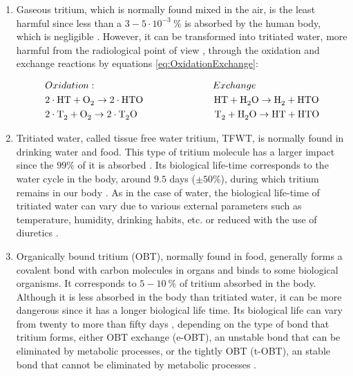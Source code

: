 \begin{enumerate}
\item{} Gaseous tritium, which is normally found mixed in the air, is the least harmful since less than a $3-5 \cdot{} 10^{-3}~\%$ is absorbed by the human body, which is negligible \cite{TritiumHandling}. However, it can be transformed into tritiated water, more harmful from the radiological point of view \cite{TritiumHandling}, through the oxidation and exchange reactions by equations \ref{eq:OxidationExchange}:

\begin{equation}
\begin{split}
& Oxidation: \qquad \qquad \qquad \qquad \qquad \qquad Exchange\\
& 2\cdot{}\ce{HT} + \ce{O_2} \rightarrow 2 \cdot{} \ce{HTO} ~ \quad \qquad \qquad \qquad \ce{HT} + \ce{H_2 O} \rightarrow \ce{H_2} + \ce{HTO}\\
& 2\cdot{}\ce{T_2} + \ce{O_2} \rightarrow 2 \cdot{} \ce{T_2 O} \qquad \qquad \qquad \qquad \ce{T_2} + \ce{H_2 O} \rightarrow \ce{HT} + \ce{HTO}
\label{eq:OxidationExchange}
\end{split}
\end{equation}

\item{} Tritiated water, called tissue free water tritium, TFWT, is normally found in drinking water and food. This type of tritium molecule has a larger impact since the $99\%$ of it is absorbed \cite{TritiumHandling}. Its biological life-time corresponds to the water cycle in the body, around $9.5$ days ($\pm50\%$), during which tritium remains in our body \cite{TritiumHandling, FranceTritiumEnvironment, EstimationTritiumDosi, TissueDistribution}. As in the case of water, the biological life-time of tritiated water can vary due to various external parameters such as temperature, humidity, drinking habits, etc. or reduced with the use of diuretics \cite{TritiumHandling}.

\item{} Organically bound tritium (OBT), normally found in food, generally forms a covalent bond with carbon molecules in organs and binds to some biological organisms. It corresponds to $5-10~\%$ of tritium absorbed in the body. Although it is less absorbed in the body than tritiated water, it can be more dangerous since it has a longer biological life time. Its biological life can vary from twenty to more than fifty days \cite{EstimationTritiumDosiKangarooRats, TissueDistribution}, depending on the type of bond that tritium forms, either OBT exchange (e-OBT), an unstable bond that can be eliminated by metabolic processes, or the tightly OBT (t-OBT), an stable bond that cannot be eliminated by metabolic processes \cite{FranceTritiumEnvironment, EstimationTritiumDosi, EstimationTritiumDosiRats, EstimationTritiumDosiKangarooRats}.
\end{enumerate}

